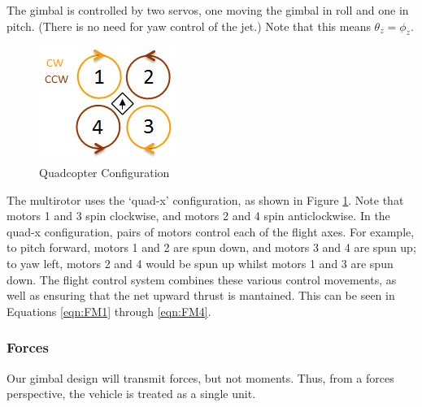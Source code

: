 \documentclass[11pt]{article}
\begin{document}
The gimbal is controlled by two servos, one moving the gimbal in roll and one in pitch. (There is no need for yaw control of the jet.)  Note that this means $\theta_z = \phi_z$.

\begin{figure}
    \begin{center}
        \includegraphics[width=0.48\linewidth]{Quad-X}
        \caption{Quadcopter Configuration}
        \label{fig:quad-x}
    \end{center}
\end{figure}

The multirotor uses the `quad-x' configuration, as shown in Figure \ref{fig:quad-x}. Note that motors 1 and 3 spin clockwise, and motors 2 and 4 spin anticlockwise. In the quad-x configuration, pairs of motors control each of the flight axes. For example, to pitch forward, motors 1 and 2 are spun down, and motors 3 and 4 are spun up; to yaw left, motors 2 and 4 would be spun up whilst motors 1 and 3 are spun down. The flight control system combines these various control movements, as well as ensuring that the net upward thrust is mantained. This can be seen in Equations \ref{eqn:FM1} through \ref{eqn:FM4}.


\subsubsection{Forces}\label{sec:Forces}
Our gimbal design will transmit forces, but not moments. Thus, from a forces perspective, the vehicle is treated as a single unit.
\end{document}
